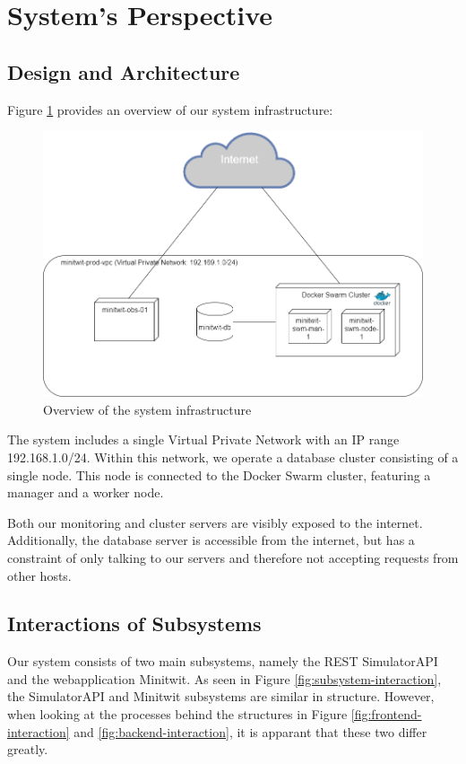 \section{System's Perspective}

\subsection{Design and Architecture}
Figure \ref{fig:systemoverview} provides an overview of our system infrastructure:
\begin{figure}[H]
    \centering
    \includegraphics[width=0.7\linewidth]{images/system-overview3.png}
    \caption{Overview of the system infrastructure}
    \label{fig:systemoverview}

\end{figure}
The system includes a single Virtual Private Network with an IP range 192.168.1.0/24. Within this network, we operate a database cluster consisting of a single node. This node is connected to the Docker Swarm cluster, featuring a manager and a worker node.

Both our monitoring and cluster servers are visibly exposed to the internet. Additionally, the database server is accessible from the internet, but has a constraint of only talking to our servers and therefore not accepting requests from other hosts.

\subsection{Interactions of Subsystems}
Our system consists of two main subsystems, namely the REST SimulatorAPI and the webapplication Minitwit. As seen in Figure \ref{fig:subsystem-interaction}, the SimulatorAPI and Minitwit subsystems are similar in structure. However, when looking at the processes behind the structures in Figure \ref{fig:frontend-interaction} and \ref{fig:backend-interaction}, it is apparant that these two differ greatly.

